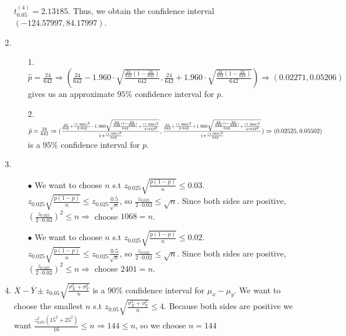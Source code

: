 \documentclass[10pt]{article}
\begin{document}
\begin{enumerate}[label=\textbf{Problem \arabic*.}]
    $t^{(4)}_{0.05}=2.13185$.
    Thus, we obtain the confidence interval $(-124.57997,84.17997)$.
    \item \begin{itemize}
        \item [1.] $\hat{p}=\frac{24}{642}\Rightarrow (\frac{24}{642}-1.960\cdot\sqrt{\frac{\frac{24}{642}(1-\frac{24}{642})}{642}},\frac{24}{642}+1.960\cdot\sqrt{\frac{\frac{24}{642}(1-\frac{24}{642})}{642}})\Rightarrow(0.02271,0.05206)$ gives us an approximate $95\%$ confidence interval for $p$.
        \item [2.] $\hat{p}=\frac{24}{642}\Rightarrow (\frac{\frac{24}{642}+\frac{{(1.960)}^2}{2\cdot642}-1.960\sqrt{\frac{\frac{24}{642}(1-\frac{24}{642})}{642}+\frac{{(1.960)}^2}{4*{642}^2}}}{1+\frac{{(1.960)}^2}{642}},\frac{\frac{24}{642}+\frac{{(1.960)}^2}{2\cdot642}+1.960\sqrt{\frac{\frac{24}{642}(1-\frac{24}{642})}{642}+\frac{{(1.960)}^2}{4*{642}^2}}}{1+\frac{{(1.960)}^2}{642}})\\
        \Rightarrow (0.02525,0.05502)$ is a $95\%$ confidence interval for $p$.
    \end{itemize}
    \item\begin{itemize}
        \item [$\bullet$] We want to choose $n$ s.t $z_{0.025}\sqrt{\frac{p(1-p)}{n}}\le0.03$. $z_{0.025}\sqrt{\frac{p(1-p)}{n}}\le z_{0.025}\frac{0.5}{\sqrt{n}}$, so $\frac{z_{0.025}}{2\cdot 0.03}\le\sqrt{n}$. Since both sides are positive, ${(\frac{z_{0.025}}{2\cdot 0.03})}^2\le n\Rightarrow$ choose $1068=n$.
        \item [$\bullet$] We want to choose $n$ s.t $z_{0.025}\sqrt{\frac{p(1-p)}{n}}\le0.02$. $z_{0.025}\sqrt{\frac{p(1-p)}{n}}\le z_{0.025}\frac{0.5}{\sqrt{n}}$, so $\frac{z_{0.025}}{2\cdot 0.02}\le\sqrt{n}$. Since both sides are positive, ${(\frac{z_{0.025}}{2\cdot 0.02})}^2\le n\Rightarrow$ choose $2401=n$.
    \end{itemize}
    \item $\overline{X}-\overline{Y}\pm z_{0.05}\sqrt{\frac{\sigma^2_X+\sigma^2_Y}{n}}$ is a $90\%$ confidence interval for $\mu_x-\mu_y$. We want to choose the smallest $n$ s.t $z_{0.05}\sqrt{\frac{\sigma^2_X+\sigma^2_Y}{n}}\le4$. Because both sides are positive we want $\frac{z_{0.05}^2(15^2+25^2)}{16}\le n\Rightarrow 144\le n$, so we choose $n=144$
\end{enumerate}
\end{document}
